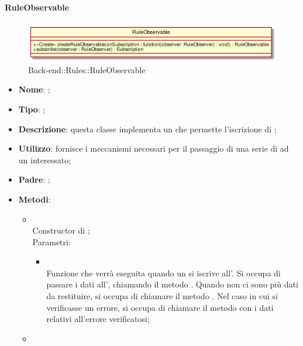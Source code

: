 \hypertarget{RuleObservable_label}{\paragraph{RuleObservable}}
\begin{figure}[h]
	\centering
	\includegraphics[width=\textwidth,height=\textheight,keepaspectratio]{images/ClassRuleObservable.png}
	\caption{Back-end::Rules::RuleObservable}
\end{figure}
\begin{itemize}
	\item \textbf{Nome}: ;
	\item \textbf{Tipo}: ;
	\item \textbf{Descrizione}: questa classe implementa un  che permette l'iscrizione di ;
	\item \textbf{Utilizzo}: fornisce i meccanismi necessari per il passaggio di una serie di  ad un  interessato;
	\item \textbf{Padre}: ;
	\item \textbf{Metodi}:
	\begin{itemize}
		\item[]  \\
		Constructor di ;\\
		Parametri:
		\begin{itemize}
			\item {} \\
			Funzione che verrà eseguita quando un  si iscrive all'. Si occupa di passare i dati all', chiamando il metodo . Quando non ci sono più dati da restituire, si occupa di chiamare il metodo . Nel caso in cui si verificasse un errore, si occupa di chiamare il metodo  con i dati relativi all'errore verificatosi;
		\end{itemize}
		\item[]  \\

\end{itemize}
\end{itemize}

